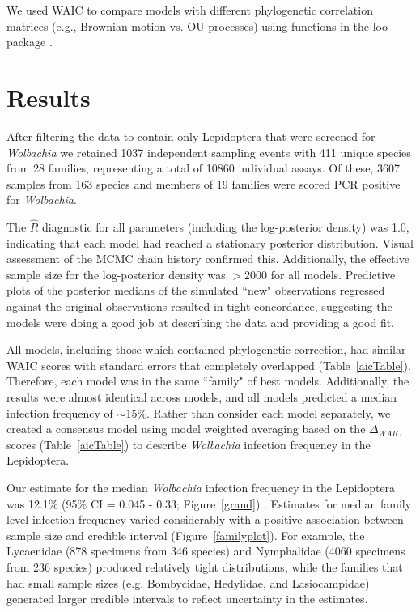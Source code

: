 \documentclass{frontiersSCNS} %
\begin{document}
We used WAIC \citep[the widely applicable or Watanabe-Akaike information criterion;][]{Watanabe:2010aa,Gelman:2014aa} to compare models with different phylogenetic correlation matrices (e.g., Brownian motion vs. OU processes) using functions in the loo package \citep{Vehtari:2016aa}. 

\section{Results}
After filtering the \citet{Weinert:2015aa} data to contain only Lepidoptera that were screened for \textit{Wolbachia} we retained 1037 independent sampling events with 411 unique species from 28 families, representing a total of 10860 individual assays. Of these, 3607 samples from 163 species and members of 19 families were scored PCR positive for \textit{Wolbachia}. 

The $\hat{R}$ diagnostic for all parameters (including the log-posterior density) was 1.0, indicating that each model had reached a stationary posterior distribution. Visual assessment of the MCMC chain history confirmed this. Additionally, the effective sample size for the log-posterior density was $> 2000$ for all models. Predictive plots of the posterior medians of the simulated ``new" observations regressed against the original observations resulted in tight concordance, suggesting the models were doing a good job at describing the data and providing a good fit. %

All models, including those which contained phylogenetic correction, had similar WAIC scores with standard errors that completely overlapped (Table~\ref{aicTable}).  Therefore, each model was in the same ``family" of best models. Additionally, the results were almost identical across models, and all models predicted a median infection frequency of $\sim 15\%$. Rather than consider each model separately, we created a consensus model using model weighted averaging based on the $\Delta_{WAIC}$ scores (Table~\ref{aicTable}) to describe \emph{Wolbachia} infection frequency in the Lepidoptera. 

Our estimate for the median \emph{Wolbachia} infection frequency in the Lepidoptera was 12.1\% (95\% CI = 0.045 - 0.33; Figure~\ref{grand}) . Estimates for median family level infection frequency varied considerably with a positive association between sample size and credible interval (Figure~\ref{familyplot}). For example, the Lycaenidae (878 specimens from 346 species) and Nymphalidae (4060 specimens from 236 species) produced relatively tight distributions, while the families that had small sample sizes (e.g. Bombycidae, Hedylidae, and Lasiocampidae) generated larger credible intervals to reflect uncertainty in the estimates. 
\end{document}
